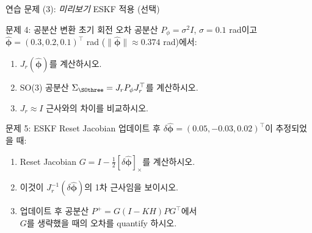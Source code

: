 \begin{frame}[shrink=5]{연습 문제 (3): \emph{미리보기} ESKF 적용 (선택)}
  \begin{block}{문제 4: 공분산 변환}
    초기 회전 오차 공분산 $P_\phi = \sigma^2 I$, $\sigma = 0.1$ rad이고\\
    $\hat{\bm{\phi}} = (0.3, 0.2, 0.1)^\top$ rad ($\|\hat{\bm{\phi}}\| \approx 0.374$ rad)에서:
    \begin{enumerate}
      \item $J_r(\hat{\bm{\phi}})$를 계산하시오.
      \item SO(3) 공분산 $\Sigma_{\SOthree} = J_r P_\phi J_r^\top$를 계산하시오.
      \item $J_r \approx I$ 근사와의 차이를 비교하시오.
    \end{enumerate}
  \end{block}
  \pause
  \begin{block}{문제 5: ESKF Reset Jacobian}
    업데이트 후 $\delta\hat{\bm{\phi}} = (0.05, -0.03, 0.02)^\top$이 추정되었을 때:
    \begin{enumerate}
      \item Reset Jacobian $G = I - \frac{1}{2}[\delta\hat{\bm{\phi}}]_\times$를 계산하시오.
      \item 이것이 $J_r^{-1}(\delta\hat{\bm{\phi}})$의 1차 근사임을 보이시오.
      \item 업데이트 후 공분산 $P^+ = G(I-KH)PG^\top$에서\\
            $G$를 생략했을 때의 오차를 quantify 하시오.
    \end{enumerate}
  \end{block}
\end{frame}


